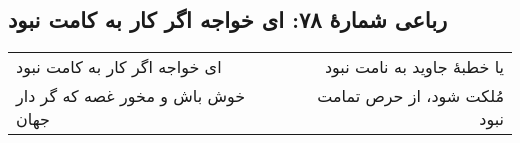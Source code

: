 \begin{center}
\section*{رباعی شمارهٔ ۷۸: ای خواجه اگر کار به کامت نبود}
\label{sec:078}
\begin{longtable}{l p{0.5cm} r}
ای خواجه اگر کار به کامت نبود
&&
یا خطبهٔ جاوید به نامت نبود
\\
خوش باش و مخور غصه که گر دار جهان
&&
مُلکت شود، از حرص تمامت نبود
\\
\end{longtable}
\end{center}
